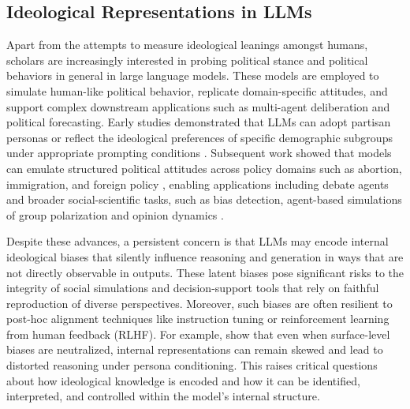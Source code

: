 \documentclass[11pt]{article}
\begin{document}
\subsection{Ideological Representations in LLMs}
Apart from the attempts to measure ideological leanings amongst humans, scholars are increasingly interested in probing political stance and political behaviors in general in large language models. These models are employed to simulate human-like political behavior, replicate domain-specific attitudes, and support complex downstream applications such as multi-agent deliberation \citep{daiArtificialLeviathanExploring2024} and political forecasting. Early studies demonstrated that LLMs can adopt partisan personas or reflect the ideological preferences of specific demographic subgroups under appropriate prompting conditions \citep{argyleOutOneMany2023, motokiMoreHumanHuman2024, potterHiddenPersuadersLLMs2024}. Subsequent work showed that models can emulate structured political attitudes across policy domains such as abortion, immigration, and foreign policy \citep{wuLargeLanguageModels2023a, ohaganMeasurementAgeLLMs2023}, enabling applications including debate agents \citep{costelloDurablyReducingConspiracy2024} and broader social-scientific tasks, such as bias detection, agent-based simulations of group polarization and opinion dynamics \citep{parkLinearRepresentationHypothesis2024, tornbergSimulatingSocialMedia2023, mouUnveilingTruthFacilitating2024}.

Despite these advances, a persistent concern is that LLMs may encode internal ideological biases that silently influence reasoning and generation in ways that are not directly observable in outputs. These latent biases pose significant risks to the integrity of social simulations and decision-support tools that rely on faithful reproduction of diverse perspectives. Moreover, such biases are often resilient to post-hoc alignment techniques like instruction tuning or reinforcement learning from human feedback (RLHF). For example, \citet{guptaBiasRunsDeep2023} show that even when surface-level biases are neutralized, internal representations can remain skewed and lead to distorted reasoning under persona conditioning. This raises critical questions about how ideological knowledge is encoded and how it can be identified, interpreted, and controlled within the model's internal structure.
\end{document}

